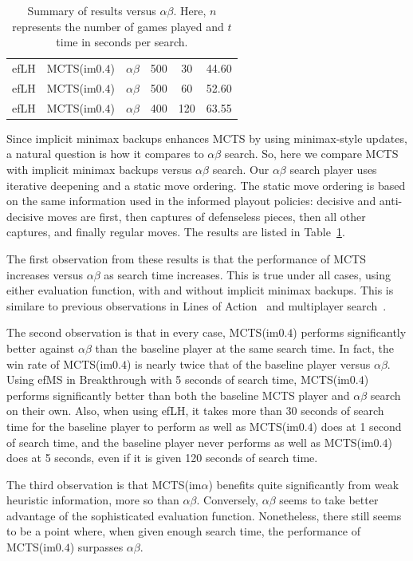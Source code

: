 \documentclass[conference]{IEEEtran}
\begin{document}
\begin{table}[t]
{\begin{center}
\begin{tabular}{ccccc|c}
efLH       & MCTS(im$0.4$)     & $\alpha\beta$    &  500   & 30      & 44.60      \\     
efLH       & MCTS(im$0.4$)     & $\alpha\beta$    &  500   & 60      & 52.60      \\     
efLH       & MCTS(im$0.4$)     & $\alpha\beta$    &  400   & 120     & 63.55      \\     
\hline
\end{tabular}
\end{center}
\caption{Summary of results versus $\alpha\beta$. 
Here, $n$ represents the number of games played and $t$ time in seconds per search.}
\label{tbl:ab_vs_mcts}
}
\end{table}

Since implicit minimax backups enhances MCTS by using minimax-style updates, a natural 
question is how it compares to $\alpha\beta$ search. 
So, here we compare MCTS with implicit minimax backups versus $\alpha\beta$ search.
Our $\alpha\beta$ search player uses iterative deepening and a static move ordering. 
The static move ordering is based on the same information used in the informed playout
policies: decisive and anti-decisive moves are first, then captures of defenseless pieces, 
then all other captures, and finally regular moves.
The results are listed in Table~\ref{tbl:ab_vs_mcts}.

The first observation from these results is that the performance of MCTS increases versus 
$\alpha\beta$ as search time increases. This is true under all cases, using either evaluation function, 
with and without implicit minimax backups. This is similare to previous observations in 
Lines of Action~\cite{Winands11AB} and multiplayer search~\cite{Sturtevant08icga,Nijssen13}.

The second observation is that in every case, MCTS(im$0.4$) performs significantly better 
against $\alpha\beta$ than the baseline player at the same search time. In fact, the win rate
of MCTS(im$0.4$) is nearly twice that of the baseline player versus $\alpha\beta$. 
Using efMS in Breakthrough with 5 seconds of search time, MCTS(im$0.4$) performs significantly 
better than both the baseline MCTS player and $\alpha\beta$ search on their own. 
Also, when using efLH, it takes more than 30 seconds of search time for the baseline player to perform
as well as MCTS(im$0.4$) does at 1 second of search time, and the baseline player
never performs as well as MCTS(im$0.4$) does at 5 seconds, even if it is given 120 seconds of search time.

The third observation is that MCTS(im$\alpha$) benefits quite significantly from weak 
heuristic information, more so than $\alpha\beta$. Conversely, $\alpha\beta$ seems to take
better advantage of the sophisticated evaluation function. Nonetheless, there still seems to be 
a point where, when given enough search time, the performance of 
MCTS(im$0.4$) surpasses $\alpha\beta$. 
\end{document}
